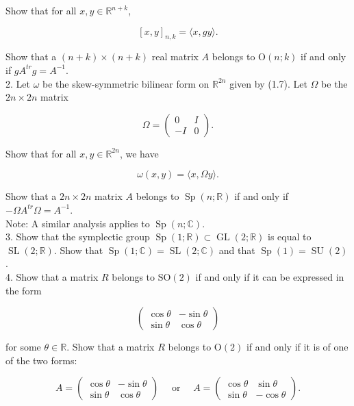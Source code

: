 \documentclass[10pt, letterpaper]{article}
\begin{document}
Show that for all $x, y \in \mathbb{R}^{n+k}$,

$$
[x, y]_{n, k}=\langle x, g y\rangle .
$$

Show that a $(n+k) \times(n+k)$ real matrix $A$ belongs to $\mathrm{O}(n ; k)$ if and only if $g A^{t r} g=A^{-1}$.\\
2. Let $\omega$ be the skew-symmetric bilinear form on $\mathbb{R}^{2 n}$ given by (1.7). Let $\Omega$ be the $2 n \times 2 n$ matrix

$$
\Omega=\left(\begin{array}{rr}
0 & I \\
-I & 0
\end{array}\right) .
$$

Show that for all $x, y \in \mathbb{R}^{2 n}$, we have

$$
\omega(x, y)=\langle x, \Omega y\rangle .
$$

Show that a $2 n \times 2 n$ matrix $A$ belongs to $\operatorname{Sp}(n ; \mathbb{R})$ if and only if $-\Omega A^{t r} \Omega= A^{-1}$.\\
Note: A similar analysis applies to $\operatorname{Sp}(n ; \mathbb{C})$.\\
3. Show that the symplectic group $\operatorname{Sp}(1 ; \mathbb{R}) \subset \operatorname{GL}(2 ; \mathbb{R})$ is equal to $\operatorname{SL}(2 ; \mathbb{R})$. Show that $\operatorname{Sp}(1 ; \mathbb{C})=\operatorname{SL}(2 ; \mathbb{C})$ and that $\operatorname{Sp}(1)=\operatorname{SU}(2)$.\\
4. Show that a matrix $R$ belongs to $\mathrm{SO}(2)$ if and only if it can be expressed in the form

$$
\left(\begin{array}{rr}
\cos \theta & -\sin \theta \\
\sin \theta & \cos \theta
\end{array}\right)
$$

for some $\theta \in \mathbb{R}$. Show that a matrix $R$ belongs to $\mathrm{O}(2)$ if and only if it is of one of the two forms:

$$
A=\left(\begin{array}{rr}
\cos \theta & -\sin \theta \\
\sin \theta & \cos \theta
\end{array}\right) \quad \text { or } \quad A=\left(\begin{array}{rr}
\cos \theta & \sin \theta \\
\sin \theta & -\cos \theta
\end{array}\right) .
$$
\end{document}
